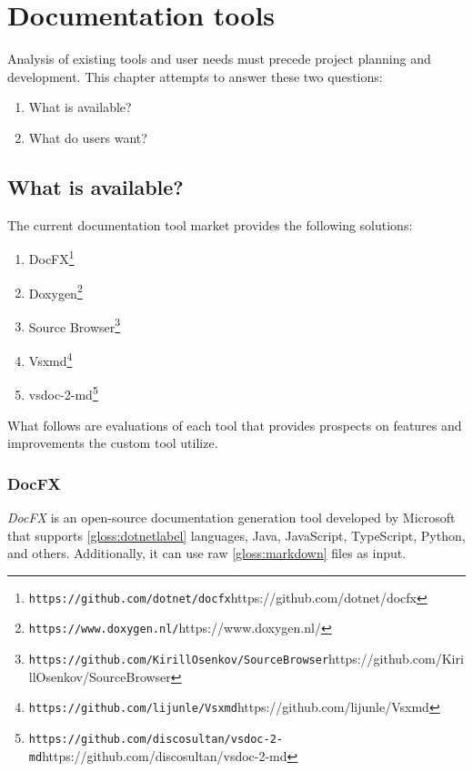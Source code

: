 \chapter{Documentation tools}

Analysis of existing tools and user needs must precede project planning and development. This chapter attempts to answer these two questions:
\begin{enumerate}
    \item What is available?
    \item What do users want?
\end{enumerate}

\section{What is available?} \label{sec:whatisavailable}
The current documentation tool market provides the following solutions:

\begin{enumerate}
    \item DocFX\footnote{\nolinkurl{https://github.com/dotnet/docfx}{https://github.com/dotnet/docfx}}
    \item Doxygen\footnote{\nolinkurl{https://www.doxygen.nl/}{https://www.doxygen.nl/}}
    \item Source Browser\footnote{\nolinkurl{https://github.com/KirillOsenkov/SourceBrowser}{https://github.com/KirillOsenkov/SourceBrowser}}
    \item Vsxmd\footnote{\nolinkurl{https://github.com/lijunle/Vsxmd}{https://github.com/lijunle/Vsxmd}}
    \item vsdoc-2-md\footnote{\nolinkurl{https://github.com/discosultan/vsdoc-2-md}{https://github.com/discosultan/vsdoc-2-md}}
\end{enumerate}

What follows are evaluations of each tool that provides prospects on features and improvements the custom tool utilize.

\subsection{DocFX} \label{ssec:docfx}

\textit{DocFX} is an open-source documentation generation tool developed by Microsoft that supports \ref{gloss:dotnetlabel} languages, Java, JavaScript, TypeScript, Python, and others. Additionally, it can use raw \ref{gloss:markdown} files as input.

